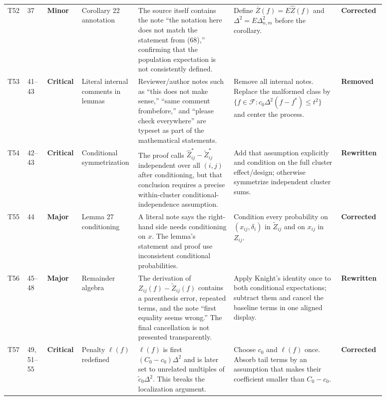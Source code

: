 \documentclass[11pt]{article}
\newcommand{\status}[1]{\textcolor{implgreen}{\textbf{#1}}}
\begin{document}
\begin{landscape}
\begin{longtable}{L{0.04\linewidth}L{0.055\linewidth}L{0.065\linewidth}L{0.11\linewidth}L{0.245\linewidth}L{0.275\linewidth}L{0.095\linewidth}}
T52 & 37 & \textcolor{minor}{\textbf{Minor}} & Corollary 22 annotation & The source itself contains the note “the notation here does not match the statement from (68),” confirming that the population expectation is not consistently defined. & Define $\overline Z(f)=E\widehat Z(f)$ and $\Delta^2=E\Delta_{n,m}^2$ before the corollary. & \status{Corrected}\\
T53 & 41--43 & \textcolor{crit}{\textbf{Critical}} & Literal internal comments in lemmas & Reviewer/author notes such as “this does not make sense,” “same comment frombefore,” and “please check everywhere” are typeset as part of the mathematical statements. & Remove all internal notes. Replace the malformed class by $\{f\in\mathcal F:c_0\Delta^2(f-f^*)\le t^2\}$ and center the process. & \status{Removed}\\
T54 & 42--43 & \textcolor{crit}{\textbf{Critical}} & Conditional symmetrization & The proof calls $\widehat Z^*_{ij}-\widetilde Z^*_{ij}$ independent over all $(i,j)$ after conditioning, but that conclusion requires a precise within-cluster conditional-independence assumption. & Add that assumption explicitly and condition on the full cluster effect/design; otherwise symmetrize independent cluster sums. & \status{Rewritten}\\
T55 & 44 & \textcolor{major}{\textbf{Major}} & Lemma 27 conditioning & A literal note says the right-hand side needs conditioning on $x$. The lemma’s statement and proof use inconsistent conditional probabilities. & Condition every probability on $(x_{ij},\delta_i)$ in $\widetilde Z_{ij}$ and on $x_{ij}$ in $Z_{ij}$. & \status{Corrected}\\
T56 & 45--48 & \textcolor{major}{\textbf{Major}} & Remainder algebra & The derivation of $Z_{ij}(f)-\widetilde Z_{ij}(f)$ contains a parenthesis error, repeated terms, and the note “first equality seems wrong.” The final cancellation is not presented transparently. & Apply Knight’s identity once to both conditional expectations; subtract them and cancel the baseline terms in one aligned display. & \status{Rewritten}\\
T57 & 49, 51--55 & \textcolor{crit}{\textbf{Critical}} & Penalty $\ell(f)$ redefined & $\ell(f)$ is first $(C_0-c_0)\Delta^2$ and is later set to unrelated multiples of $\widetilde c_0\Delta^2$. This breaks the localization argument. & Choose $c_0$ and $\ell(f)$ once. Absorb tail terms by an assumption that makes their coefficient smaller than $C_0-c_0$. & \status{Corrected}\\

\end{longtable}
\end{landscape}
\end{document}
